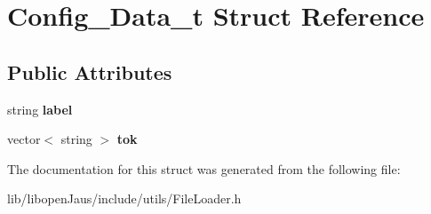 \hypertarget{struct_config___data__t}{\section{\-Config\-\_\-\-Data\-\_\-t \-Struct \-Reference}
\label{struct_config___data__t}
}
\subsection*{\-Public \-Attributes}
\begin{DoxyCompactItemize}
\item 
\hypertarget{struct_config___data__t_a6b97b46ed4fad99bbff5d9568e0d9580}{string {\bfseries label}}\label{struct_config___data__t_a6b97b46ed4fad99bbff5d9568e0d9580}

\item 
\hypertarget{struct_config___data__t_a5cb80bfd73c951ee5c6ffee627518ce2}{vector$<$ string $>$ {\bfseries tok}}\label{struct_config___data__t_a5cb80bfd73c951ee5c6ffee627518ce2}

\end{DoxyCompactItemize}


\-The documentation for this struct was generated from the following file\-:\begin{DoxyCompactItemize}
\item 
lib/libopen\-Jaus/include/utils/\-File\-Loader.\-h\end{DoxyCompactItemize}
